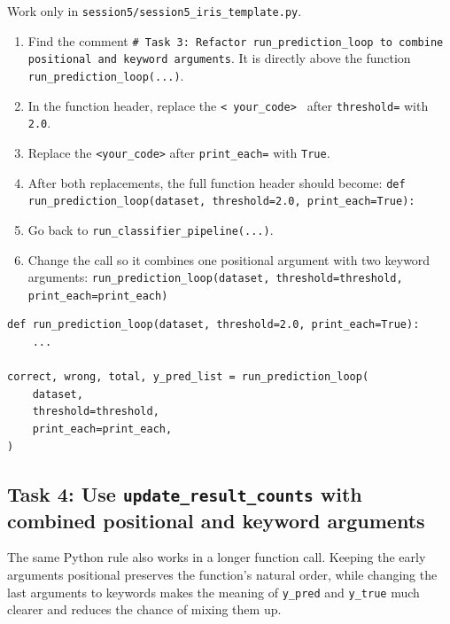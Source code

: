 \begin{tcolorbox}[title=Task 3: Refactor \texttt{run\_prediction\_loop} to combine positional and keyword arguments]
Work only in \texttt{session5/session5\_iris\_template.py}.

\begin{enumerate}
    \item Find the comment \texttt{\# Task 3: Refactor run\_prediction\_loop to combine positional and keyword arguments}. It is directly above the function \texttt{run\_prediction\_loop(...)}.
    \item In the function header, replace the \texttt{< your\_code> } after \texttt{threshold=} with \texttt{2.0}.
    \item Replace the \texttt{<your\_code>} after \texttt{print\_each=} with \texttt{True}.
    \item After both replacements, the full function header should become:
    \texttt{def run\_prediction\_loop(dataset, threshold=2.0, print\_each=True):}
    \item Go back to \texttt{run\_classifier\_pipeline(...)}.
    \item Change the call so it combines one positional argument with two keyword arguments:
    \texttt{run\_prediction\_loop(dataset, threshold=threshold, print\_each=print\_each)}
\end{enumerate}
\end{tcolorbox}

\begin{verbatim}
def run_prediction_loop(dataset, threshold=2.0, print_each=True):
    ...

correct, wrong, total, y_pred_list = run_prediction_loop(
    dataset,
    threshold=threshold,
    print_each=print_each,
)
\end{verbatim}

\subsection{Task 4: Use \texttt{update\_result\_counts} with combined positional and keyword arguments}
The same Python rule also works in a longer function call. Keeping the early arguments positional preserves the function's natural order, while changing the last arguments to keywords makes the meaning of \texttt{y\_pred} and \texttt{y\_true} much clearer and reduces the chance of mixing them up.

